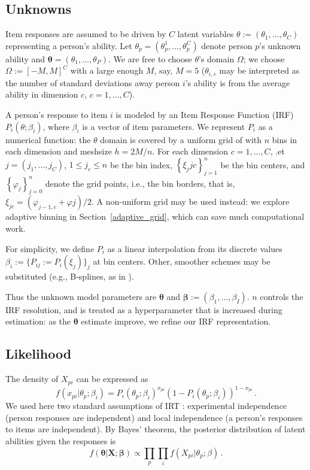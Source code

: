 \documentclass{article}
\newcommand{\bbeta}{\boldsymbol\beta}
\newcommand{\bta}{\boldsymbol\ta}
\newcommand{\ta}{\theta}
\newcommand{\bX}{\mathbf{X}}
\begin{document}
\subsection{Unknowns}
Item responses are assumed to be driven by $C$ latent variables $\ta := (\ta_1,\dots,\ta_C)$ representing a person's ability. Let $\ta_p=(\ta_p^1,\dots,\ta_p^C)$ denote person $p$'s unknown ability and $\bta = (\ta_1,\dots,\ta_P)$. We are free to choose $\ta$'s domain $\Omega$; we choose $\Omega := [-M,M]^C$ with a large enough $M$, say, $M = 5$ ($\ta_{i,c}$ may be interpreted as the number of standard deviations away person $i$'s ability is from the average ability in dimension $c$, $c=1,\dots,C$).

A person's response to item $i$ is modeled by an Item Response Function (IRF) $P_i(\ta;\beta_i)$, where $\beta_i$ is a vector of item parameters. We represent $P_i$ as a numerical function: the $\ta$ domain is covered by a uniform grid of with $n$ bins in each dimension and meshsize $h = 2 M / n$. For each dimension $c=1,\dots,C$, .et $j=(j_1,\dots,j_C)$, $1 \leq j_c \leq n$ be the bin index, $\left\{\xi_j{jc} \right\}_{j=1}^n$ be the bin centers, and $\left\{\varphi_j\right\}_{j=0}^n$ denote the grid points, i.e., the bin borders, that is, $\xi_{jc} = (\varphi_{j-1,c} + \varphi{j})/2$. A non-uniform grid may be used instead: we explore adaptive binning in Section~\ref{adaptive_grid}, which can save much computational work. 

For simplicity, we define $P_i$ as a linear interpolation from its discrete values $\beta_i := \{P_{ij} := P_i(\xi_j)\}_j$ at bin centers. Other, smoother schemes may be substituted (e.g., B-splines, as in \cite{matt_bsplines}).

Thus the unknown model parameters are $\bta$ and $\bbeta := (\beta_1,\dots,\beta_I)$. $n$ controls the IRF resolution, and is treated as a hyperparameter that is increased during estimation: as the $\bta$ estimate improve, we refine our IRF representation.

\subsection{Likelihood}
The density of $X_{pi}$ can be expressed as 
\begin{equation}
  f(x_{pi}|\ta_p;\beta_i) = P_i(\ta_p;\beta_i)^{x_{pi}} \left(1 - P_i(\ta_p;\beta_i)\right)^{1-x_{pi}}\,.
\end{equation}
We used here two standard assumptions of IRT \cite{junker}: experimental independence (person responses are independent) and local independence (a person's responses to items are independent). By Bayes' theorem, the posterior distribution of latent abilities given the responses is
\begin{equation}
  f(\bta|\bX;\bbeta) \propto\prod_p \prod_i f(X_{pi}|\ta_p;\beta)\,.
  \label{like}
\end{equation}
\end{document}
